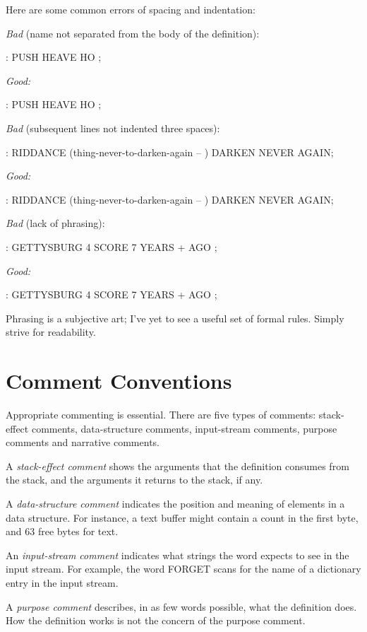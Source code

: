 Here are some common errors of spacing and indentation:

\goodbreak\bigskip\noindent
\emph{Bad} (name not separated from the body of the definition):
\begin{Code}
: PUSH HEAVE HO ;
\end{Code}
\emph{Good:}
\begin{Code}
: PUSH   HEAVE HO ;
\end{Code}
\emph{Bad} (subsequent lines not indented three spaces):
\begin{Code}
: RIDDANCE (thing-never-to-darken-again -- )
DARKEN   NEVER AGAIN;
\end{Code}
\emph{Good:}
\begin{Code}
: RIDDANCE (thing-never-to-darken-again -- )
   DARKEN NEVER AGAIN;
\end{Code}
\emph{Bad} (lack of phrasing):
\begin{Code}
: GETTYSBURG   4 SCORE 7 YEARS + AGO ;
\end{Code}
\goodbreak\noindent
\emph{Good:}
\begin{Code}
: GETTYSBURG   4 SCORE   7 YEARS +   AGO ;
\end{Code}
Phrasing is a subjective art; I've yet to see a useful set of formal rules.
Simply strive for readability.

\section{Comment Conventions}
Appropriate commenting is essential.  There are five types of comments:
stack-effect comments, data-structure comments, input-stream comments,
purpose comments and narrative comments.

A \emph{stack-effect comment} shows the arguments that the definition
consumes from the stack, and the arguments it returns to the stack, if
any.

A \emph{data-structure comment} indicates the position and meaning of elements
in a data structure.  For instance, a text buffer might contain a
count in the first byte, and 63 free bytes for text.

An \emph{input-stream comment} indicates what strings the word expects
to see in the input stream.  For example, the \Forth{} word FORGET
scans for the name of a dictionary entry in the input stream.

A \emph{purpose comment} describes, in as few words possible, what the
definition does.  How the definition works is not the concern of the purpose
comment.

